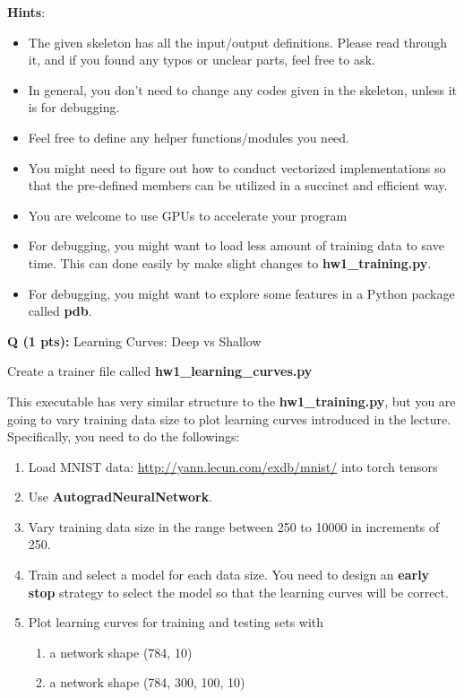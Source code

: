 \documentclass{article}
\newcommand{\homeworknumber}{1}
\newcounter{questionno}
\newcounter{partno}
\newcommand{\question}[1]{
\noindent
\newline
\stepcounter{questionno}
\setcounter{partno}{0}
{\bf Q\arabic{questionno} (#1 pts): }
}
\begin{document}
\noindent \textbf{Hints}:
\begin{itemize}
    \item The given skeleton has all the input/output definitions. Please read through it, and if you found any typos or unclear parts, feel free to ask.
    \item In general, you don't need to change any codes given in the skeleton, unless it is for debugging.
    \item Feel free to define any helper functions/modules you need.
    \item You might need to figure out how to conduct vectorized implementations so that the pre-defined members can be utilized in a succinct and efficient way.
    \item You are welcome to use GPUs to accelerate your program
    \item For debugging, you might want to load less amount of training data to save time. This can done easily by make slight changes to \textbf{hw\homeworknumber\_training.py}.
    \item For debugging, you might want to explore some features in a Python package called \textbf{pdb}.
\end{itemize}

\question{1}{Learning Curves: Deep vs Shallow}

\noindent Create a trainer file called \textbf{hw\homeworknumber\_learning\_curves.py}

\hfill

\noindent This executable has very similar structure to the \textbf{hw\homeworknumber\_training.py}, but you are
going to vary training data size to plot learning curves introduced in the
lecture. Specifically, you need to do the followings:
\begin{enumerate}
  \item Load MNIST data: \url{http://yann.lecun.com/exdb/mnist/} into torch
        tensors
  \item Use \textbf{AutogradNeuralNetwork}.
  \item Vary training data size in the range between 250 to 10000 in increments of 250.
  \item Train and select a model for each data size. You need to design an \textbf{early
        stop} strategy to select the model so that the learning curves will be correct.
  \item Plot learning curves for training and testing sets with
    \begin{enumerate}
      \item a network shape (784, 10)
      \item a network shape (784, 300, 100, 10)
    \end{enumerate}
\end{enumerate}
\end{document}
